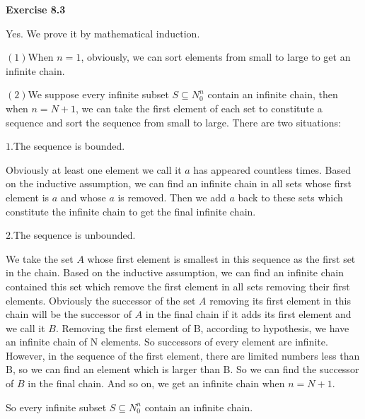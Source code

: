\documentclass{article} %
\begin{document}
	\textbf{Exercise 8.3}\par
    Yes. We prove it by mathematical induction.\par
    $(1)$When $n=1$, obviously, we can sort elements from small to large to get an infinite chain.\par
    $(2)$We suppose every infinite subset $S \subseteq N_0^n$ contain an infinite chain, then when $n=N+1$, we can take the first element of each set to constitute a sequence and sort the sequence from small to large. There are two situations:\par
    $1.$The sequence is bounded.\par
    Obviously at least one element we call it $a$ has appeared countless times. Based on the inductive assumption, we can find an infinite chain in all sets whose first element is $a$ and whose $a$ is removed. Then we add $a$ back to these sets which constitute the infinite chain to get the final infinite chain.\par
    $2.$The sequence is unbounded.\par
    We take the set $A$ whose first element is smallest in this sequence as the first set in the chain. Based on the inductive assumption, we can find an infinite chain contained this set which remove the first element in all sets removing their first elements. Obviously the successor of the set $A$ removing its first element in this chain will be the successor of $A$ in the final chain if it adds its first element and we call it $B$. Removing the first element of B, according to hypothesis, we have an infinite chain of N elements. So successors of every element are infinite. However, in the sequence of the first element, there are limited numbers less than B, so we can find an element which is larger than B. So we can find the successor of $B$ in the final chain. And so on, we get an infinite chain when $n=N+1$.\par
    So every infinite subset $S \subseteq N_0^n$ contain an infinite chain.


	
\end{document}
